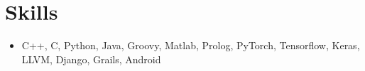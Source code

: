 \documentclass[letterpaper,11pt]{article}
\newcommand{\resumeSubHeadingListStart}{\begin{itemize}[leftmargin=*]}
\newcommand{\resumeSubHeadingListEnd}{\end{itemize}}
\begin{document}
%
\section{Skills}
  \resumeSubHeadingListStart
    \item{
      \textbf{}{C++, C, Python, Java, Groovy, Matlab, Prolog, PyTorch, Tensorflow, Keras, LLVM, Django, Grails, Android}
      \hfill
    }
  \resumeSubHeadingListEnd
%
\end{document}

